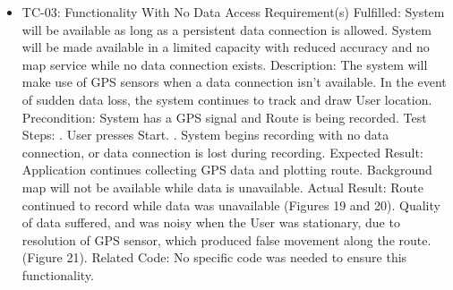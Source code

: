 \documentclass{article}
\begin{document}
\begin {itemize}
\item TC-03: Functionality With No Data Access
\subitem Requirement(s) Fulfilled:
\subsubitem System will be available as long as a persistent data connection is allowed.
\subsubitem System will be made available in a limited capacity with reduced accuracy and no map service while no data connection exists.
\subitem Description: The system will make use of GPS sensors when a data connection isn't available. In the event of sudden data loss, the system continues to track and draw User location.
\subitem Precondition: System has a GPS signal and Route is being recorded.
\subitem Test Steps:
. User presses Start.
. System begins recording with no data connection, or data connection is lost during recording.
\subitem Expected Result: Application continues collecting GPS data and plotting route. Background map will not be available while data is unavailable.
\subitem Actual Result: Route continued to record while data was unavailable (Figures 19 and 20). Quality of data suffered, and was noisy when the User was stationary, due to resolution of GPS sensor, which produced false movement along the route. (Figure 21).
\subitem Related Code: No specific code was needed to ensure this functionality.
\end {itemize}
\end{document}
